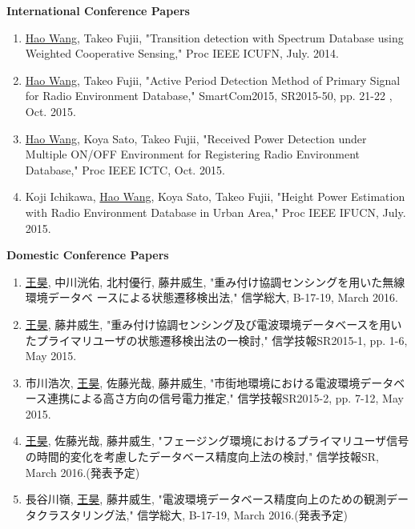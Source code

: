 \begin{publication}
{\bf International Conference Papers}
  \begin{enumerate}[{}i{.}]
  
      \item \underline{Hao Wang}, Takeo Fujii, "Transition detection with Spectrum Database using Weighted Cooperative Sensing," Proc IEEE ICUFN, July. 2014.
 
      \item \underline{Hao Wang}, Takeo Fujii, "Active Period Detection Method of Primary Signal for Radio Environment Database," SmartCom2015, SR2015-50, pp. 21-22 , Oct. 2015.
      \item \underline{Hao Wang}, Koya Sato, Takeo Fujii, "Received Power Detection under Multiple ON/OFF Environment for Registering Radio Environment Database," Proc IEEE ICTC, Oct. 2015.
 
      \item Koji Ichikawa, \underline{Hao Wang}, Koya Sato, Takeo Fujii, "Height Power Estimation with Radio Environment Database in Urban Area," Proc IEEE IFUCN, July. 2015.
   \end{enumerate}
{\bf Domestic Conference Papers}
    \begin{enumerate}[{}i{.}]
        \item \underline{王昊}, 中川洸佑, 北村優行, 藤井威生, "重み付け協調センシングを用いた無線環境データベ ースによる状態遷移検出法," 信学総大, B-17-19, March 2016.
         \item \underline{王昊}, 藤井威生, "重み付け協調センシング及び電波環境データベースを用いたプライマリユーザの状態遷移検出法の一検討," 信学技報SR2015-1, pp. 1-6, May 2015.
         \item 市川浩次, \underline{王昊}, 佐藤光哉, 藤井威生, "市街地環境における電波環境データベース連携による高さ方向の信号電力推定," 信学技報SR2015-2, pp. 7-12, May 2015.
         \item \underline{王昊}, 佐藤光哉, 藤井威生, "フェージング環境におけるプライマリユーザ信号の時間的変化を考慮したデータベース精度向上法の検討," 信学技報SR, March 2016.(発表予定)
         \item 長谷川嶺, \underline{王昊}, 藤井威生, "電波環境データベース精度向上のための観測データクラスタリング法," 信学総大, B-17-19, March 2016.(発表予定)
    \end{enumerate}

\end{publication}
